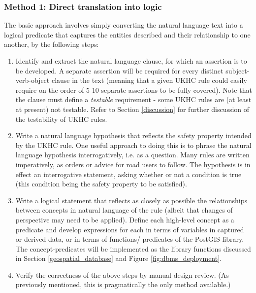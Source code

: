 \subsubsection{Method 1: Direct translation into logic} \label{direct_translation}

The basic approach involves simply converting the natural language text into a logical predicate that captures the entities described and their relationship to one another, by the following steps: 
\begin{enumerate}
    \item Identify and extract the natural language clause, for which an assertion is to be developed. A separate assertion will be required for every distinct subject-verb-object clause in the text (meaning that a given UKHC rule could easily require on the order of 5-10 separate assertions to be fully covered). Note that the clause must define a \emph{testable} requirement - some UKHC rules are (at least at present) not testable. Refer to Section \ref{discussion} for further discussion of the testability of UKHC rules.
    \item Write a natural language hypothesis that reflects the safety property intended by the UKHC rule. One useful approach to doing this is to phrase the natural language hypothesis interrogatively, i.e. as a question. Many rules are written imperatively, as orders or advice for road users to follow. The hypothesis is in effect an interrogative statement, asking whether or not a condition is true (this condition being the safety property to be satisfied). 
    \item Write a logical statement that reflects as closely as possible the relationships between concepts in natural language of the rule (albeit that changes of perspective may need to be applied). Define each high-level concept as a predicate and develop expressions for each in terms of variables in captured or derived data, or in terms of functions/ predicates of the PostGIS library. The concept-predicates will be implemented as the library functions discussed in Section \ref{geospatial_database} and Figure \ref{fig:dbms_deployment}.
    \item Verify the correctness of the above steps by manual design review. (As previously mentioned, this is pragmatically the only method available.)
\end{enumerate}

